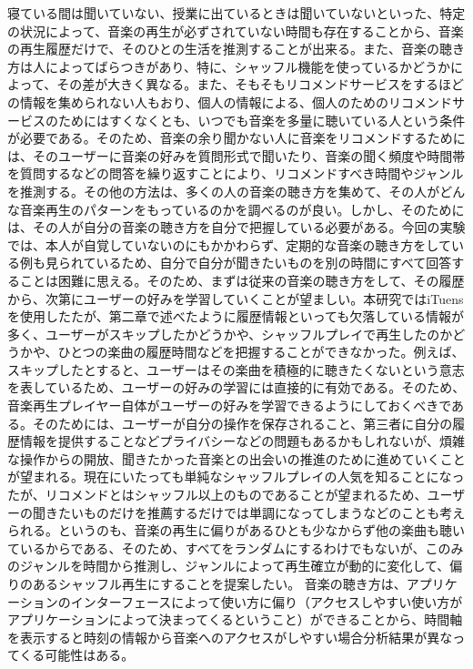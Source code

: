 \documentclass{jsarticle}
\begin{document}
寝ている間は聞いていない、授業に出ているときは聞いていないといった、特定の状況によって、音楽の再生が必ずされていない時間も存在することから、音楽の再生履歴だけで、そのひとの生活を推測することが出来る。また、音楽の聴き方は人によってばらつきがあり、特に、シャッフル機能を使っているかどうかによって、その差が大きく異なる。また、そもそもリコメンドサービスをするほどの情報を集められない人もおり、個人の情報による、個人のためのリコメンドサービスのためにはすくなくとも、いつでも音楽を多量に聴いている人という条件が必要である。そのため、音楽の余り聞かない人に音楽をリコメンドするためには、そのユーザーに音楽の好みを質問形式で聞いたり、音楽の聞く頻度や時間帯を質問するなどの問答を繰り返すことにより、リコメンドすべき時間やジャンルを推測する。その他の方法は、多くの人の音楽の聴き方を集めて、その人がどんな音楽再生のパターンをもっているのかを調べるのが良い。しかし、そのためには、その人が自分の音楽の聴き方を自分で把握している必要がある。今回の実験では、本人が自覚していないのにもかかわらず、定期的な音楽の聴き方をしている例も見られているため、自分で自分が聞きたいものを別の時間にすべて回答することは困難に思える。そのため、まずは従来の音楽の聴き方をして、その履歴から、次第にユーザーの好みを学習していくことが望ましい。本研究ではiTuensを使用したたが、第二章で述べたように履歴情報といっても欠落している情報が多く、ユーザーがスキップしたかどうかや、シャッフルプレイで再生したのかどうかや、ひとつの楽曲の履歴時間などを把握することができなかった。例えば、スキップしたとすると、ユーザーはその楽曲を積極的に聴きたくないという意志を表しているため、ユーザーの好みの学習には直接的に有効である。そのため、音楽再生プレイヤー自体がユーザーの好みを学習できるようにしておくべきである。そのためには、ユーザーが自分の操作を保存されること、第三者に自分の履歴情報を提供することなどプライバシーなどの問題もあるかもしれないが、煩雑な操作からの開放、聞きたかった音楽との出会いの推進のために進めていくことが望まれる。現在にいたっても単純なシャッフルプレイの人気を知ることになったが、リコメンドとはシャッフル以上のものであることが望まれるため、ユーザーの聞きたいものだけを推薦するだけでは単調になってしまうなどのことも考えられる。というのも、音楽の再生に偏りがあるひとも少なからず他の楽曲も聴いているからである、そのため、すべてをランダムにするわけでもないが、このみのジャンルを時間から推測し、ジャンルによって再生確立が動的に変化して、偏りのあるシャッフル再生にすることを提案したい。
音楽の聴き方は、アプリケーションのインターフェースによって使い方に偏り（アクセスしやすい使い方がアプリケーションによって決まってくるということ）ができることから、時間軸を表示すると時刻の情報から音楽へのアクセスがしやすい場合分析結果が異なってくる可能性はある。
\end{document}
